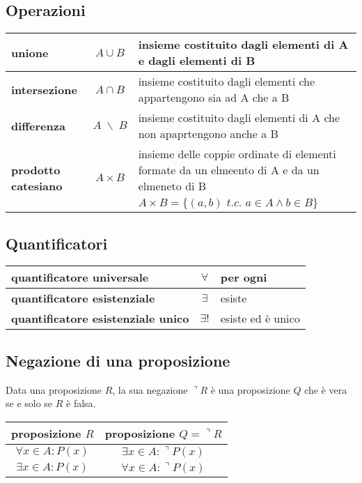 \documentclass[a4paper]{article}
\begin{document}
\subsection{Operazioni}
\begin{center}
	\begin{tabularx}{\textwidth}{l c X}
		\textbf{unione} & \(A \cup B\) & insieme costituito dagli elementi di A e dagli elementi di B \\
		\midrule
		\textbf{intersezione} & \(A \cap B\) & insieme costituito dagli elementi che appartengono sia ad A che a B \\
		\midrule
		\textbf{differenza} & \(A \; \backslash \; B\) & insieme costituito dagli elementi di A che non apaprtengono anche a B \\
		\midrule
		\multirow{2}{*}{\textbf{prodotto catesiano}} & 	\multirow{2}{*}{\(A \times B\)} & insieme delle coppie ordinate di elementi formate da un elmeento di A e da un elmeneto di B \\
		& & \(A \times B = \{ (a, b) \textit{ t.c. } a \in A \land b \in B \}\)
	\end{tabularx}
\end{center}


\subsection{Quantificatori}
\begin{center}
	\begin{tabular}{l c l}
		\textbf{quantificatore universale} & \(\forall\) & per ogni \\
		\midrule
		\textbf{quantificatore esistenziale} & \(\exists\) & esiste \\
		\midrule
		\textbf{quantificatore esistenziale unico} & \(\exists!\) & esiste ed è unico
	\end{tabular}
\end{center}


\subsection{Negazione di una proposizione}
Data una proposizione \(R\), la sua negazione \(\urcorner R\) è una proposizione \(Q\) che è vera se e solo se \(R\) è falsa.

\begin{center}
	\begin{tabular}{c c}
		proposizione \(R\) & proposizione \(Q = \urcorner R\) \\
		\toprule
		\(\forall x \in A : P(x)\) & \(\exists x \in A : \urcorner P(x)\) \\
		\midrule
		\(\exists x \in A : P(x)\) & \(\forall x \in A : \urcorner P(x)\) \\
	\end{tabular}
\end{center}
\end{document}
